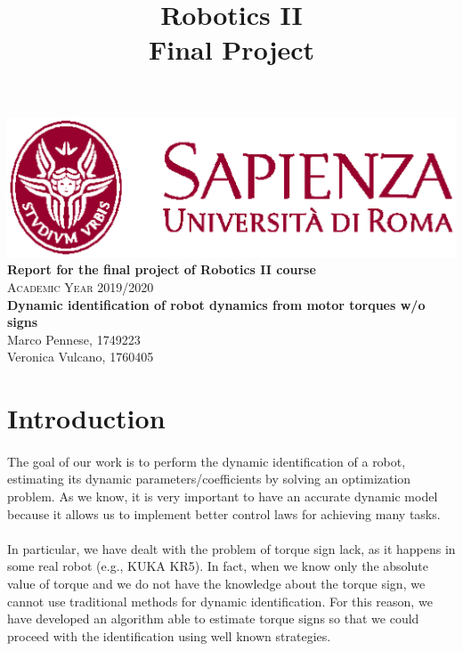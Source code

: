 \documentclass{article}
\title{\textbf{Robotics II} \\ \large{\textbf{Final Project}}}
\date{}
\begin{document}
\begin{titlepage}
    \begin{center}
        \includegraphics[width=0.2 \textwidth] {images/logo.eps}\\
        \vspace{10 em}
        {\Large \textbf{Report for the final project of Robotics II course}}\\
        \vspace{3em}
        {\Large \textsc{Academic Year 2019/2020}}\\
        \vspace{6 em}
        {\huge \textbf{Dynamic identification of robot dynamics from motor torques w/o signs}}\\
        \vspace{3 em}
        {\large Marco Pennese, 1749223}\\
        {\large Veronica Vulcano, 1760405}
        \vspace{10 em}
    \end{center}
\end{titlepage}

\maketitle
\tableofcontents
\pagebreak

\section{Introduction}
\paragraph{}The goal of our work is to perform the dynamic identification of a robot, estimating its dynamic parameters/coefficients by solving an optimization problem. As we know, it is very important to have an accurate dynamic model because it allows us to implement better control laws for achieving many tasks.
\paragraph{}In particular, we have dealt with the problem of torque sign lack, as it happens in some real robot (e.g., KUKA KR5). In fact, when we know only the absolute value of torque and we do not have the knowledge about the torque sign, we cannot use traditional methods for dynamic identification. For this reason, we have developed an algorithm able to estimate torque signs so that we could proceed with the identification using well known strategies.
\end{document}
